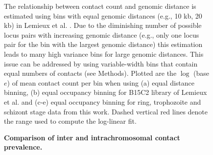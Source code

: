 \begin{figure}
\begin{center}
\end{center}
\caption{{\bf Comparison of inter and intrachromosomal contact prevalence. }}
{ The relationship between contact count and genomic distance is estimated
    using bins with equal genomic distances (e.g., 10 kb, 20 kb) in Lemieux
    et al. \cite{lemieux:genome-wide}. Due to the diminishing number of possible
    locus pairs with increasing genomic distance (e.g., only one locus pair for
    the bin with the largest genomic distance) this estimation leads to many
    high variance bins for large genomic distances. This issue can be addressed
    by using variable-width bins that contain equal numbers of
    contacts (see Methods). Plotted are the $\log$ (base $e$) of mean
    contact count per bin when using (a) equal distance binning, (b)
    equal occupancy binning for B15C2 library of Lemieux et
    al. \cite{lemieux:genome-wide} and (c-e) equal occupancy binning for
    ring, trophozoite and schizont stage data from this work. Dashed vertical
    red lines denote the range used to compute the log-linear fit.
}
\label{suppfig:intraVSinter}
\end{figure}
\clearpage

